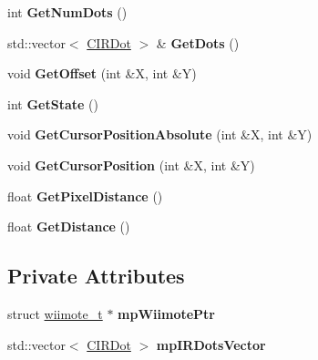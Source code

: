 \begin{DoxyCompactItemize}
\item 
\hypertarget{class_c_i_r_a76afd635873b098e0cd6c8b9bcab9587}{int {\bfseries Get\-Num\-Dots} ()}\label{class_c_i_r_a76afd635873b098e0cd6c8b9bcab9587}

\item 
\hypertarget{class_c_i_r_a696847a5468daceba452bbd152f0e853}{std\-::vector$<$ \hyperlink{class_c_i_r_dot}{C\-I\-R\-Dot} $>$ \& {\bfseries Get\-Dots} ()}\label{class_c_i_r_a696847a5468daceba452bbd152f0e853}

\item 
\hypertarget{class_c_i_r_aeb23613d64e95e7e7fff717c83f68377}{void {\bfseries Get\-Offset} (int \&X, int \&Y)}\label{class_c_i_r_aeb23613d64e95e7e7fff717c83f68377}

\item 
\hypertarget{class_c_i_r_aee4bc6e44ee5903b2c45cc46bf5be361}{int {\bfseries Get\-State} ()}\label{class_c_i_r_aee4bc6e44ee5903b2c45cc46bf5be361}

\item 
\hypertarget{class_c_i_r_a573324907a9082fe70d65b419ed83a5e}{void {\bfseries Get\-Cursor\-Position\-Absolute} (int \&X, int \&Y)}\label{class_c_i_r_a573324907a9082fe70d65b419ed83a5e}

\item 
\hypertarget{class_c_i_r_a8b37d7fa74319ff3736cf39956f82df0}{void {\bfseries Get\-Cursor\-Position} (int \&X, int \&Y)}\label{class_c_i_r_a8b37d7fa74319ff3736cf39956f82df0}

\item 
\hypertarget{class_c_i_r_a254b766dbc50c29d5d08ae8375e764f8}{float {\bfseries Get\-Pixel\-Distance} ()}\label{class_c_i_r_a254b766dbc50c29d5d08ae8375e764f8}

\item 
\hypertarget{class_c_i_r_aa9d59cb470867a28b558f310b154fcc2}{float {\bfseries Get\-Distance} ()}\label{class_c_i_r_aa9d59cb470867a28b558f310b154fcc2}

\end{DoxyCompactItemize}
\subsection*{Private Attributes}
\begin{DoxyCompactItemize}
\item 
\hypertarget{class_c_i_r_aa1a05a67ac59456976f1f5ad6b894137}{struct \hyperlink{structwiimote__t}{wiimote\-\_\-t} $\ast$ {\bfseries mp\-Wiimote\-Ptr}}\label{class_c_i_r_aa1a05a67ac59456976f1f5ad6b894137}

\item 
\hypertarget{class_c_i_r_a3edb622c7e2bd20852c0fe6bb0e427e5}{std\-::vector$<$ \hyperlink{class_c_i_r_dot}{C\-I\-R\-Dot} $>$ {\bfseries mp\-I\-R\-Dots\-Vector}}\label{class_c_i_r_a3edb622c7e2bd20852c0fe6bb0e427e5}

\end{DoxyCompactItemize}


